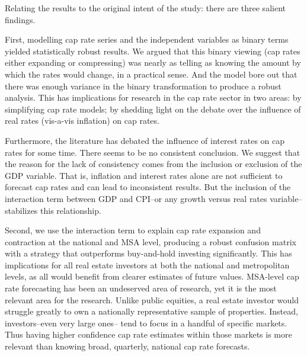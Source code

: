 \pagebreak
Relating the results to the original intent of the study: there are three salient findings.

First, modelling cap rate series and the independent variables as binary terms yielded statistically robust results. We argued that this binary viewing (cap rates either expanding or compressing) was nearly as telling as knowing the amount by which the rates would change, in a practical sense. And the model bore out that there was enough variance in the binary transformation to produce a robust analysis. This has implications for research in the cap rate sector in two areas: by simplifying cap rate models; by shedding light on the debate over the influence of real rates (vis-a-vis inflation) on cap rates.

Furthermore, the literature has debated the influence of interest rates on cap rates for some time. There seems to be no consistent conclusion. We suggest that the reason for the lack of consistency comes from the inclusion or exclusion of the GDP variable. That is, inflation and interest rates alone are not sufficient to forecast cap rates and can lead to inconsistent results. But the inclusion of the interaction term between GDP and CPI--or any growth versus real rates variable-- stabilizes this relationship.

Second, we use the interaction term to explain cap rate expansion and contraction at the national and MSA level, producing a robust confusion matrix with a strategy that outperforms buy-and-hold investing significantly. This has implications for all real estate investors at both the national and metropolitan levels, as all would benefit from clearer estimates of future values. MSA-level cap rate forecasting has been an undeserved area of research, yet it is the most relevant area for the research. Unlike public equities, a real estate investor would struggle greatly to own a nationally representative sample of properties. Instead, investors--even very large ones-- tend to focus in a handful of specific markets. Thus having higher confidence cap rate estimates within those markets is more relevant than knowing broad, quarterly, national cap rate forecasts.

